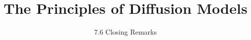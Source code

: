﻿%

\graphicspath{{../images/}}
\title{The Principles of Diffusion Models}
\subtitle{7.6 Closing Remarks}


\begin{frame}
    \titlepage
\end{frame}


